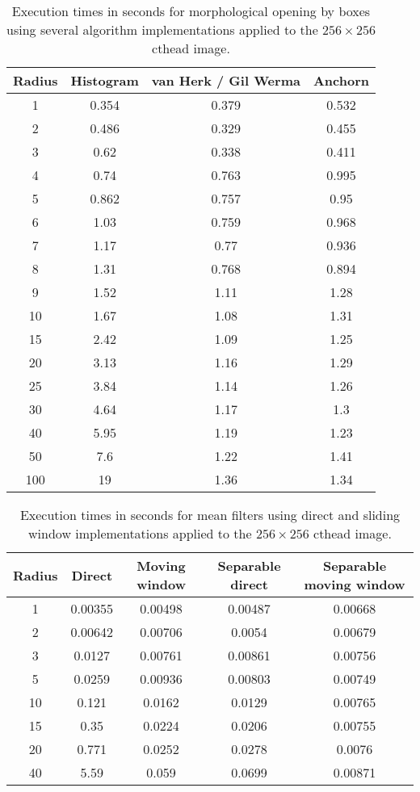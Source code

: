 \documentclass{InsightArticle}
\begin{document}
\begin{table}[phtb]
\centering
\begin{tabular}{cccc}
\hline
Radius	&	Histogram	&	van Herk / Gil Werma	&	Anchorn	\\
\hline
1	&	0.354	&	0.379	&	0.532	\\
2	&	0.486	&	0.329	&	0.455	\\
3	&	0.62	&	0.338	&	0.411	\\
4	&	0.74	&	0.763	&	0.995	\\
5	&	0.862	&	0.757	&	0.95	\\
6	&	1.03	&	0.759	&	0.968	\\
7	&	1.17	&	0.77	&	0.936	\\
8	&	1.31	&	0.768	&	0.894	\\
9	&	1.52	&	1.11	&	1.28	\\
10	&	1.67	&	1.08	&	1.31	\\
15	&	2.42	&	1.09	&	1.25	\\
20	&	3.13	&	1.16	&	1.29	\\
25	&	3.84	&	1.14	&	1.26	\\
30	&	4.64	&	1.17	&	1.3	\\
40	&	5.95	&	1.19	&	1.23	\\
50	&	7.6	&	1.22	&	1.41	\\
100	&	19	&	1.36	&	1.34	\\
\hline
\hline
\end{tabular}
\caption{Execution times in seconds for morphological opening by boxes using several algorithm implementations applied to the $256 \times 256$ cthead image.\label{tab:perf2Dpoly}}
\end{table}


\begin{table}[phtb]
\centering
\begin{tabular}{ccccc}
\hline
Radius	&	Direct	&	Moving window	&	Separable direct	&	Separable moving window	\\
\hline
1	&	0.00355	&	0.00498	&	0.00487	&	0.00668	\\
2	&	0.00642	&	0.00706	&	0.0054	&	0.00679	\\
3	&	0.0127	&	0.00761	&	0.00861	&	0.00756	\\
5	&	0.0259	&	0.00936	&	0.00803	&	0.00749	\\
10	&	0.121	&	0.0162	&	0.0129	&	0.00765	\\
15	&	0.35	&	0.0224	&	0.0206	&	0.00755	\\
20	&	0.771	&	0.0252	&	0.0278	&	0.0076	\\
40	&	5.59	&	0.059	&	0.0699	&	0.00871	\\
\hline
\hline
\end{tabular}
\caption{Execution times in seconds for mean filters using direct and sliding window implementations applied to the $256 \times 256$ cthead image.\label{tab:perfRankMean}}
\end{table}
\end{document}
